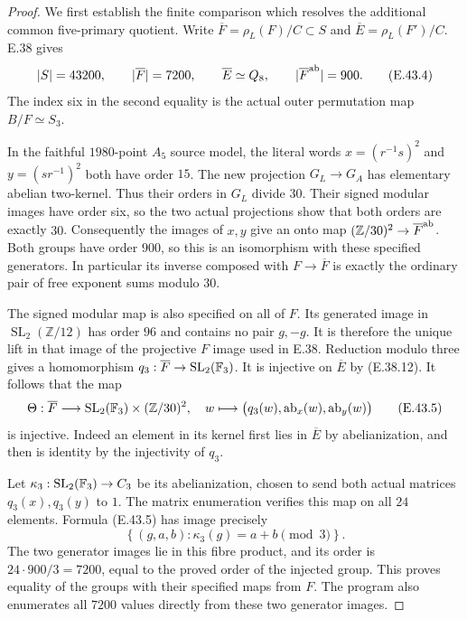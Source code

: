 \begin{proof}
We first establish the finite comparison which
resolves the additional common five-primary quotient.
Write $\overline F=\rho_L(F)/C\subset S$ and
$\overline E=\rho_L(F')/C$.
E.38 gives
\[
 |S|=43200,\qquad |\overline F|=7200,
 \qquad \overline E\simeq Q_8,
 \qquad |\overline F^{\rm ab}|=900.
 \tag{E.43.4}
\]
The index six in the second equality is the actual
outer permutation map $B/F\simeq S_3$.

In the faithful $1980$-point $A_5$ source model,
the literal words
$x=(r^{-1}s)^2$ and $y=(sr^{-1})^2$
both have order $15$.
The new projection $G_L\to G_A$ has elementary
abelian two-kernel.  Thus their orders in $G_L$
divide $30$.  Their signed modular images have
order six, so the two actual projections show
that both orders are exactly $30$.
Consequently the images of $x,y$ give an onto
map $(\mathbb Z/30)^2\to\overline F^{\rm ab}$.
Both groups have order $900$, so this is an
isomorphism with these specified generators.
In particular its inverse composed with
$F\to\overline F$ is exactly the ordinary
pair of free exponent sums modulo $30$.

The signed modular map is also specified on
all of $F$.  Its generated image in
$\operatorname{SL}_2(\mathbb Z/12)$ has order
$96$ and contains no pair $g,-g$.
It is therefore the unique lift in that image
of the projective $F$ image used in E.38.
Reduction modulo three gives a homomorphism
$q_3:\overline F\to\operatorname{SL}_2(\mathbb F_3)$.
It is injective on $\overline E$ by (E.38.12).
It follows that the map
\[
 \Theta:\overline F\longrightarrow
       \operatorname{SL}_2(\mathbb F_3)\times(\mathbb Z/30)^2,
 \quad
 w\longmapsto
 \bigl(q_3(w),\operatorname{ab}_x(w),
                         \operatorname{ab}_y(w)\bigr)
 \tag{E.43.5}
\]
is injective.  Indeed an element in its kernel
first lies in $\overline E$ by abelianization,
and then is identity by the injectivity of $q_3$.

Let $\kappa_3:\operatorname{SL}_2(\mathbb F_3)\to C_3$
be its abelianization, chosen to send both actual
matrices $q_3(x),q_3(y)$ to $1$.
The matrix enumeration verifies this map on
all $24$ elements.  Formula \textup{(E.43.5)}
has image precisely
\[
 \left\{(g,a,b):\kappa_3(g)=a+b\pmod3\right\}.
 \tag{E.43.6}
\]
The two generator images lie in this fibre
product, and its order is $24\cdot900/3=7200$,
equal to the proved order of the injected group.
This proves equality of the groups with their
specified maps from $F$.
The program also enumerates all $7200$ values
directly from these two generator images.


\end{proof}
